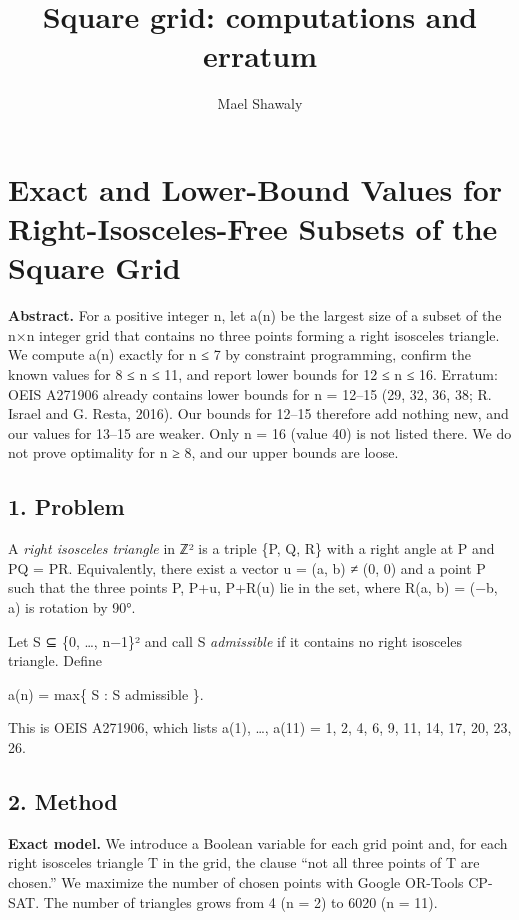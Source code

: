 \documentclass[
  11pt,
]{article}
\title{Square grid: computations and erratum}
\author{Mael Shawaly}
\date{}
\begin{document}
\maketitle

\section{Exact and Lower-Bound Values for Right-Isosceles-Free Subsets
of the Square
Grid}\label{exact-and-lower-bound-values-for-right-isosceles-free-subsets-of-the-square-grid}

\textbf{Abstract.} For a positive integer n, let a(n) be the largest
size of a subset of the n×n integer grid that contains no three points
forming a right isosceles triangle. We compute a(n) exactly for n ≤ 7 by
constraint programming, confirm the known values for 8 ≤ n ≤ 11, and
report lower bounds for 12 ≤ n ≤ 16. Erratum: OEIS A271906 already
contains lower bounds for n = 12--15 (29, 32, 36, 38; R. Israel and G.
Resta, 2016). Our bounds for 12--15 therefore add nothing new, and our
values for 13--15 are weaker. Only n = 16 (value 40) is not listed
there. We do not prove optimality for n ≥ 8, and our upper bounds are
loose.

\subsection{1. Problem}\label{problem}

A \emph{right isosceles triangle} in ℤ² is a triple \{P, Q, R\} with a
right angle at P and \textbar PQ\textbar{} = \textbar PR\textbar.
Equivalently, there exist a vector u = (a, b) ≠ (0, 0) and a point P
such that the three points P, P+u, P+R(u) lie in the set, where R(a, b)
= (−b, a) is rotation by 90°.

Let S ⊆ \{0, \ldots, n−1\}² and call S \emph{admissible} if it contains
no right isosceles triangle. Define

a(n) = max\{ \textbar S\textbar{} : S admissible \}.

This is OEIS A271906, which lists a(1), \ldots, a(11) = 1, 2, 4, 6, 9,
11, 14, 17, 20, 23, 26.

\subsection{2. Method}\label{method}

\textbf{Exact model.} We introduce a Boolean variable for each grid
point and, for each right isosceles triangle T in the grid, the clause
``not all three points of T are chosen.'' We maximize the number of
chosen points with Google OR-Tools CP-SAT. The number of triangles grows
from 4 (n = 2) to 6020 (n = 11).
\end{document}
